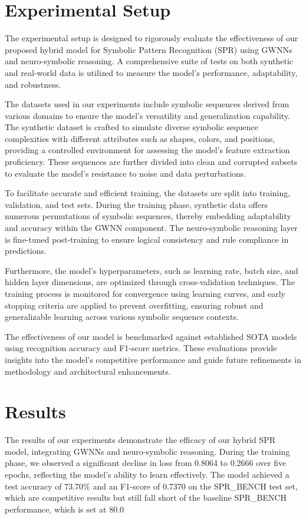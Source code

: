\documentclass{article}
\begin{document}
\section{Experimental Setup}
The experimental setup is designed to rigorously evaluate the effectiveness of our proposed hybrid model for Symbolic Pattern Recognition (SPR) using GWNNs and neuro-symbolic reasoning. A comprehensive suite of tests on both synthetic and real-world data is utilized to measure the model's performance, adaptability, and robustness.

The datasets used in our experiments include symbolic sequences derived from various domains to ensure the model's versatility and generalization capability. The synthetic dataset is crafted to simulate diverse symbolic sequence complexities with different attributes such as shapes, colors, and positions, providing a controlled environment for assessing the model's feature extraction proficiency. These sequences are further divided into clean and corrupted subsets to evaluate the model's resistance to noise and data perturbations.

To facilitate accurate and efficient training, the datasets are split into training, validation, and test sets. During the training phase, synthetic data offers numerous permutations of symbolic sequences, thereby embedding adaptability and accuracy within the GWNN component. The neuro-symbolic reasoning layer is fine-tuned post-training to ensure logical consistency and rule compliance in predictions.

Furthermore, the model’s hyperparameters, such as learning rate, batch size, and hidden layer dimensions, are optimized through cross-validation techniques. The training process is monitored for convergence using learning curves, and early stopping criteria are applied to prevent overfitting, ensuring robust and generalizable learning across various symbolic sequence contexts.

The effectiveness of our model is benchmarked against established SOTA models using recognition accuracy and F1-score metrics. These evaluations provide insights into the model's competitive performance and guide future refinements in methodology and architectural enhancements.
\section{Results}
The results of our experiments demonstrate the efficacy of our hybrid SPR model, integrating GWNNs and neuro-symbolic reasoning. During the training phase, we observed a significant decline in loss from 0.8064 to 0.2666 over five epochs, reflecting the model's ability to learn effectively. The model achieved a test accuracy of 73.70\% and an F1-score of 0.7370 on the SPR_BENCH test set, which are competitive results but still fall short of the baseline SPR_BENCH performance, which is set at 80.0%
\end{document}
